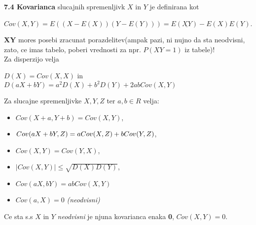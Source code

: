 \documentclass{article}
\begin{document}
\begin{multicols}{2}
\textbf{7.4 Kovarianca} slucajnih spremenljivk $X$ in $Y$ je definirana kot
\begin{center}
    \begin{math}
        Cov(X,Y) = E((X - E(X)) (Y - E(Y))) = E(\underline{XY}) - E(X)E(Y)
    \end{math}.
\end{center}
\textbf{XY} mores posebi zracunat porazdelitev(ampak pazi, ni nujno da sta neodvisni, zato, ce imas tabelo, poberi vrednosti za npr. $P(XY = 1)$ iz tabele)!\\
Za disperzijo velja
\begin{center}
    \begin{math}
        D(X) = Cov(X, X)
    \end{math} in\\
    \begin{math}
        D(aX + bY) = a^2D(X) + b^2D(Y) + 2abCov(X, Y)
    \end{math}
\end{center}
Za slucajne spremenljivke $X, Y, Z$ ter $a,b \in R$ velja:
\begin{itemize}
    \item \begin{math}
        Cov(X + a, Y + b) = Cov(X, Y)
    \end{math},
    \item \begin{math}
        Cov(aX + bY, Z) =\\ aCov(X, Z) + bCov(Y,Z)
    \end{math},
    \item \begin{math}
        Cov(X, Y) = Cov(Y, X)
    \end{math},
    \item \begin{math}
        |Cov(X, Y)| \leq \sqrt{D(X)D(Y)}
    \end{math},
    \item \begin{math}
        Cov(aX, bY) = abCov(X, Y)
    \end{math}
    \item \begin{math}
        Cov(a, X) = 0 
    \end{math} \textit{(neodvisni)}
\end{itemize}

Ce sta s.s $X$ in $Y$ \textit{neodvisni} je njuna kovarianca enaka \textbf{0},
$Cov(X,Y) = 0$.


\end{multicols}
\end{document}
